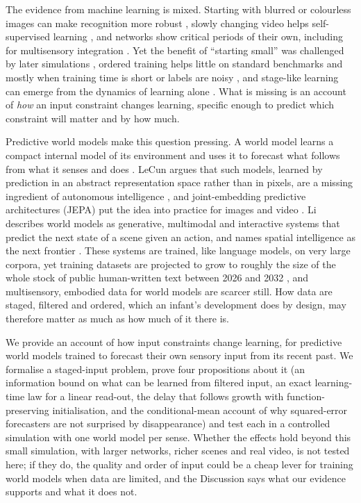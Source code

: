 \documentclass{article}
\begin{document}
The evidence from machine learning is mixed. Starting with blurred or colourless images can make recognition more robust \autocite{vogelsang2018potential,vogelsang2024impact}, slowly changing video helps self-supervised learning \autocite{sheybani2023curriculum}, and networks show critical periods of their own, including for multisensory integration \autocite{achille2019critical,kleinman2023critical}. Yet the benefit of ``starting small'' \autocite{elman1993learning} was challenged by later simulations \autocite{rohde1999language}, ordered training helps little on standard benchmarks and mostly when training time is short or labels are noisy \autocite{wu2021curricula}, and stage-like learning can emerge from the dynamics of learning alone \autocite{saxe2019mathematical}. What is missing is an account of \emph{how} an input constraint changes learning, specific enough to predict which constraint will matter and by how much.

Predictive world models make this question pressing. A world model learns a compact internal model of its environment and uses it to forecast what follows from what it senses and does \autocite{ha2018world}. LeCun argues that such models, learned by prediction in an abstract representation space rather than in pixels, are a missing ingredient of autonomous intelligence \autocite{lecun2022path}, and joint-embedding predictive architectures (JEPA) put the idea into practice for images and video \autocite{assran2023self,bardes2024revisiting,garrido2025intuitive}. Li describes world models as generative, multimodal and interactive systems that predict the next state of a scene given an action, and names spatial intelligence as the next frontier \autocite{li2025words}. These systems are trained, like language models, on very large corpora, yet training datasets are projected to grow to roughly the size of the whole stock of public human-written text between 2026 and 2032 \autocite{villalobos2024will}, and multisensory, embodied data for world models are scarcer still. How data are staged, filtered and ordered, which an infant's development does by design, may therefore matter as much as how much of it there is.

We provide an account of how input constraints change learning, for predictive world models trained to forecast their own sensory input from its recent past. We formalise a staged-input problem, prove four propositions about it (an information bound on what can be learned from filtered input, an exact learning-time law for a linear read-out, the delay that follows growth with function-preserving initialisation, and the conditional-mean account of why squared-error forecasters are not surprised by disappearance) and test each in a controlled simulation with one world model per sense. Whether the effects hold beyond this small simulation, with larger networks, richer scenes and real video, is not tested here; if they do, the quality and order of input could be a cheap lever for training world models when data are limited, and the Discussion says what our evidence supports and what it does not.
\end{document}
